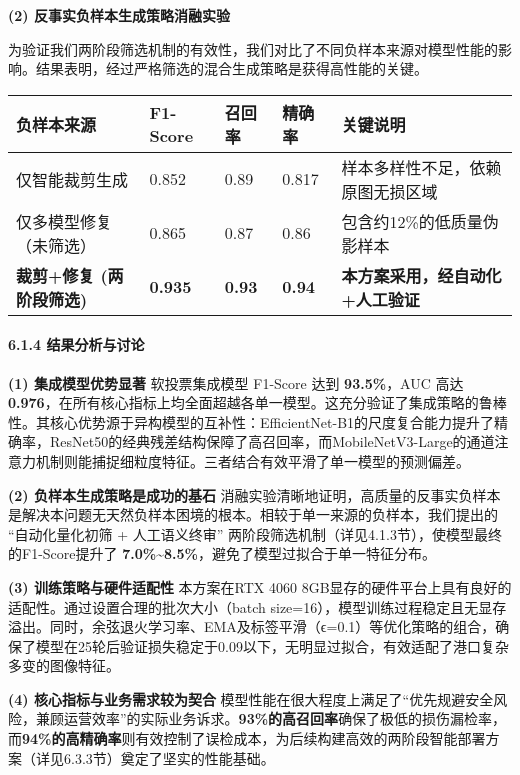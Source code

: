 \documentclass[
]{article}
\begin{document}
\textbf{(2) 反事实负样本生成策略消融实验}

为验证我们两阶段筛选机制的有效性，我们对比了不同负样本来源对模型性能的影响。结果表明，经过严格筛选的混合生成策略是获得高性能的关键。

\begin{longtable}[]{@{}lllll@{}}
\toprule\noalign{}
负样本来源 & F1-Score & 召回率 & 精确率 & 关键说明 \\
\midrule\noalign{}
\endhead
\bottomrule\noalign{}
\endlastfoot
仅智能裁剪生成 & 0.852 & 0.89 & 0.817 &
样本多样性不足，依赖原图无损区域 \\
仅多模型修复（未筛选） & 0.865 & 0.87 & 0.86 &
包含约12\%的低质量伪影样本 \\
\textbf{裁剪+修复 (两阶段筛选)} & \textbf{0.935} & \textbf{0.93} &
\textbf{0.94} & \textbf{本方案采用，经自动化+人工验证} \\
\end{longtable}

\paragraph{\texorpdfstring{\textbf{6.1.4
结果分析与讨论}}{6.1.4 结果分析与讨论}}\label{614-ux7ed3ux679cux5206ux6790ux4e0eux8ba8ux8bba}

\textbf{(1) 集成模型优势显著} 软投票集成模型 F1-Score 达到
\textbf{93.5\%}，AUC 高达
\textbf{0.976}，在所有核心指标上均全面超越各单一模型。这充分验证了集成策略的鲁棒性。其核心优势源于异构模型的互补性：EfficientNet-B1的尺度复合能力提升了精确率，ResNet50的经典残差结构保障了高召回率，而MobileNetV3-Large的通道注意力机制则能捕捉细粒度特征。三者结合有效平滑了单一模型的预测偏差。

\textbf{(2) 负样本生成策略是成功的基石}
消融实验清晰地证明，高质量的反事实负样本是解决本问题无天然负样本困境的根本。相较于单一来源的负样本，我们提出的
``自动化量化初筛 + 人工语义终审''
两阶段筛选机制（详见4.1.3节），使模型最终的F1-Score提升了
\textbf{7.0\%\textasciitilde8.5\%}，避免了模型过拟合于单一特征分布。

\textbf{(3) 训练策略与硬件适配性} 本方案在RTX 4060
8GB显存的硬件平台上具有良好的适配性。通过设置合理的批次大小（batch
size=16），模型训练过程稳定且无显存溢出。同时，余弦退火学习率、EMA及标签平滑（ϵ=0.1）等优化策略的组合，确保了模型在25轮后验证损失稳定于0.09以下，无明显过拟合，有效适配了港口复杂多变的图像特征。

\textbf{(4) 核心指标与业务需求较为契合}
模型性能在很大程度上满足了``优先规避安全风险，兼顾运营效率''的实际业务诉求。\textbf{93\%的高召回率}确保了极低的损伤漏检率，而\textbf{94\%的高精确率}则有效控制了误检成本，为后续构建高效的两阶段智能部署方案（详见6.3.3节）奠定了坚实的性能基础。
\end{document}
